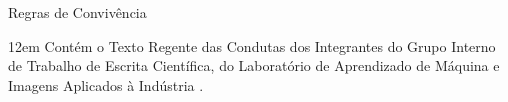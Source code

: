 
\begin{titlepage}

\vspace*{\fill} %

\begin{flushright}
{\LARGE Regras de Convivência } \\ [1.5cm]
\end{flushright}

\leftskip12em
Contém o Texto Regente das Condutas dos Integrantes do Grupo Interno de Trabalho de Escrita Científica, do Laboratório de Aprendizado de Máquina e Imagens Aplicados à Indústria .

\vspace{1.5\baselineskip}

\end{titlepage}